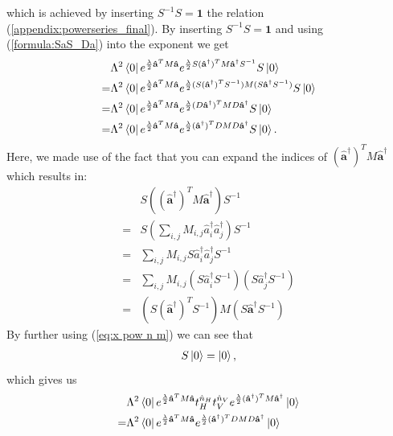 \documentclass[%
 reprint,
 amsmath,amssymb,
 aps,
twocolumn
]{revtex4-2}
\begin{document}
which is achieved by inserting $S^{-1}S=\mathbf{1}$ the relation (\ref{appendix:powerseries_final}). By inserting $S^{-1}S=\mathbf{1}$ and using (\ref{formula:SaS_Da}) into the exponent we get
\begin{align}
&\Lambda^2\bra{0} e^{\frac{\lambda}{2} \mathbf{\hat a}^T M\mathbf{\hat a}} e^{\frac{\lambda}{2} S (\mathbf{\hat a^{\dagger}})^T M \mathbf{\hat a^{\dagger}}S^{-1}}S \ket{0}\\
=&\Lambda^2\bra{0} e^{\frac{\lambda}{2} \mathbf{\hat a}^T M\mathbf{\hat a}} e^{\frac{\lambda}{2} (S (\mathbf{\hat a^{\dagger}})^T S^{-1}) M (S \mathbf{\hat a^{\dagger}}S^{-1})}S \ket{0}\\
=&\Lambda^2\bra{0} e^{\frac{\lambda}{2} \mathbf{\hat a}^T M\mathbf{\hat a}} e^{\frac{\lambda}{2} (D\mathbf{\hat a^{\dagger}})^T M D\mathbf{\hat a^{\dagger}}}S \ket{0}\\
=&\Lambda^2\bra{0} e^{\frac{\lambda}{2} \mathbf{\hat a}^T M\mathbf{\hat a}} e^{\frac{\lambda}{2} (\mathbf{\hat a^{\dagger}})^T D M D\mathbf{\hat a^{\dagger}}}S \ket{0}.\label{formula:tmsv_DaMDa}
\end{align}
Here, we made use of the fact that you can expand the indices of $(\mathbf{\hat a^{\dagger}})^T M \mathbf{\hat a^{\dagger}}$ which results in:
\begin{align}
&S\left((\mathbf{\hat a^{\dagger}})^T M \mathbf{\hat a^{\dagger}}\right)S^{-1}\\=&S\left(\sum_{i,j}M_{i,j}\hat a_i^{\dagger}\hat a_j^{\dagger}\right)S^{-1}\\
=&\sum_{i,j}M_{i,j}S\hat a_i^{\dagger}\hat a_j^{\dagger}S^{-1}\\
=&\sum_{i,j}M_{i,j}\left(S\hat a_i^{\dagger}S^{-1}\right)\left(S\hat a_j^{\dagger}S^{-1}\right)\\
=&\left(S(\mathbf{\hat a^{\dagger}})^TS^{-1}\right)M\left(S\mathbf{\hat a^{\dagger}}S^{-1}\right)
\end{align}
By further using (\ref{eq:x pow n m}) we can see that
\begin{align}
S\ket{0}=\ket{0},
\end{align}
which gives us
\begin{align}
&\Lambda^2\bra{0} e^{\frac{\lambda}{2} \mathbf{\hat a}^T M\mathbf{\hat a}} t_H^{\hat{n}_H} t_V^{\hat{n}_V} e^{\frac{\lambda}{2} (\mathbf{\hat a^{\dagger}})^T M \mathbf{\hat a^{\dagger}}} \ket{0}\\
=&\Lambda^2\bra{0} e^{\frac{\lambda}{2} \mathbf{\hat a}^T M\mathbf{\hat a}}  e^{\frac{\lambda}{2} (\mathbf{\hat a^{\dagger}})^T DMD \mathbf{\hat a^{\dagger}}} \ket{0}\label{eq:tmsv_aDMDa}
\end{align}
\end{document}

